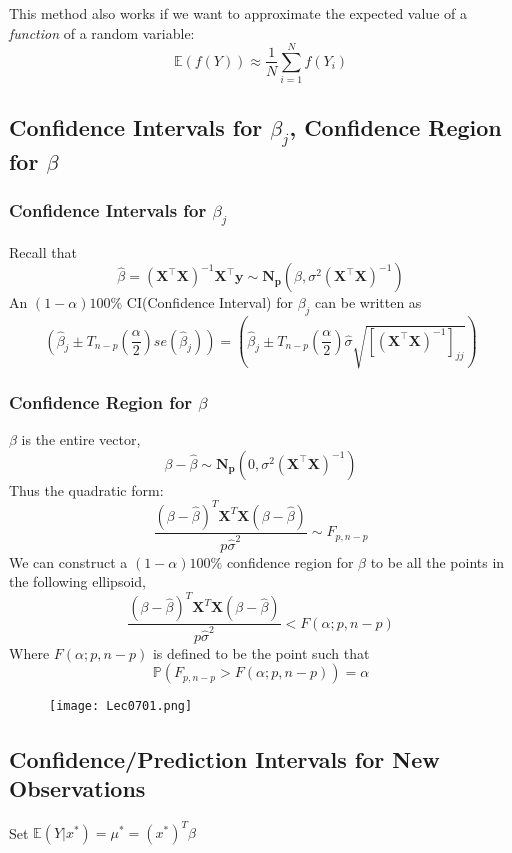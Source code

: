 \documentclass[11pt,a4paper]{article}
\begin{document}
This method also works if we want to approximate the expected value of a \textit{function} of a random variable:
$$
\mathbb{E}(f(Y)) \approx \frac{1}{N} \sum_{i=1}^{N} f\left(Y_{i}\right)
$$

\subsection{Confidence Intervals for $\beta_j$, Confidence Region for $\beta$}
\subsubsection{Confidence Intervals for $\beta_j$}
Recall that
$$\hat{\beta}=\left(\mathbf{X}^{\top} \mathbf{X}\right)^{-1} \mathbf{X}^{\top} \mathbf{y} \sim \mathbf{N}_{\mathbf{p}}\left(\beta, \sigma^{2}\left(\mathbf{X}^{\top} \mathbf{X}\right)^{-1}\right)$$
An $(1-\alpha)100\%$ CI(Confidence Interval) for $\beta_j$ can be written as
$$(\hat{\beta}_j \pm T_{n-p}(\frac{\alpha}{2})se(\hat{\beta}_j))=(\hat{\beta}_j \pm T_{n-p}(\frac{\alpha}{2})\hat{\sigma}\sqrt{[\left(\mathbf{X}^{\top} \mathbf{X}\right)^{-1}]_{jj}})$$
\subsubsection{Confidence Region for $\beta$}
$\beta$ is the entire vector,
$$\beta-\hat{\beta}\sim\mathbf{N}_{\mathbf{p}}\left(0, \sigma^{2}\left(\mathbf{X}^{\top} \mathbf{X}\right)^{-1}\right)$$
Thus the quadratic form:
$$\frac{(\beta-\hat{\beta})^T \mathbf{X}^T \mathbf{X}(\beta-\hat{\beta})}{p \hat{\sigma}^2}\sim F_{p,n-p}$$
We can construct a $(1-\alpha)100\%$ conﬁdence region for $\beta$ to be all the points in the following ellipsoid,
$$\frac{(\beta-\hat{\beta})^T \mathbf{X}^T \mathbf{X}(\beta-\hat{\beta})}{p \hat{\sigma}^2}<F(\alpha; p,n-p)$$
Where $F(\alpha; p,n-p)$ is defined to be the point such that $$\mathbb{P}(F_{p,n-p}>F(\alpha; p,n-p))=\alpha$$
\begin{center}\begin{figure}[htbp]
    \centering
    \texttt{[image: Lec0701.png]}
    \caption{}
    \label{}
\end{figure}\end{center}

\subsection{Conﬁdence/Prediction Intervals for New Observations}
Set $\mathbb{E}(Y|x^*)=\mu^*=(x^*)^T\beta$
\end{document}
